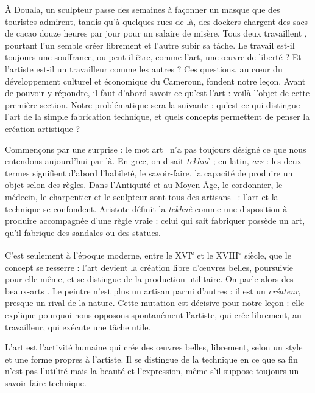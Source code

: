\documentclass[11pt]{article}
\newcommand{\cle}[1]{{\popxbold\color{popdark}#1}}
\newcounter{popsec}
\newcounter{popsub}
\newcommand{\courssub}[1]{%
  \stepcounter{popsub}%
  \par\vspace{9pt}\noindent{\popxbold\fontsize{11.5}{13}\selectfont\color{popink}{\color{poporange}\thepopsec.\thepopsub}\hspace{6pt}#1}\par\nopagebreak\vspace{4pt}
}
\begin{document}
À Douala, un sculpteur passe des semaines à façonner un masque que des touristes admirent, tandis qu'à quelques rues de là, des dockers chargent des sacs de cacao douze heures par jour pour un salaire de misère. Tous deux \guillemotleft travaillent \guillemotright, pourtant l'un semble créer librement et l'autre subir sa tâche. Le travail est-il toujours une souffrance, ou peut-il être, comme l'art, une œuvre de liberté ? Et l'artiste est-il un travailleur comme les autres ? Ces questions, au cœur du développement culturel et économique du Cameroun, fondent notre leçon. Avant de pouvoir y répondre, il faut d'abord savoir ce qu'est l'art : voilà l'objet de cette première section. Notre problématique sera la suivante : qu'est-ce qui distingue l'art de la simple fabrication technique, et quels concepts permettent de penser la création artistique ?

\courssub{Étymologie et histoire du concept d'art}

Commençons par une surprise : le mot \guillemotleft art \guillemotright\ n'a pas toujours désigné ce que nous entendons aujourd'hui par là. En grec, on disait \emph{tekhnè} ; en latin, \emph{ars} : les deux termes signifient d'abord l'\cle{habileté}, le \cle{savoir-faire}, la capacité de produire un objet selon des règles. Dans l'Antiquité et au Moyen Âge, le cordonnier, le médecin, le charpentier et le sculpteur sont tous des \guillemotleft artisans \guillemotright\ : l'art et la technique se confondent. Aristote définit la \emph{tekhnè} comme une disposition à produire accompagnée d'une règle vraie : celui qui sait fabriquer possède un art, qu'il fabrique des sandales ou des statues.

C'est seulement à l'époque moderne, entre le XVI\textsuperscript{e} et le XVIII\textsuperscript{e} siècle, que le concept se resserre : l'\cle{art} devient la création libre d'œuvres belles, poursuivie pour elle-même, et se distingue de la production utilitaire. On parle alors des \guillemotleft beaux-arts \guillemotright. Le peintre n'est plus un artisan parmi d'autres : il est un \emph{créateur}, presque un rival de la nature. Cette mutation est décisive pour notre leçon : elle explique pourquoi nous opposons spontanément l'artiste, qui crée librement, au travailleur, qui exécute une tâche utile.

\begin{definition}[L'art]
L'\cle{art} est l'activité humaine qui crée des œuvres belles, librement, selon un \cle{style} et une \cle{forme} propres à l'artiste. Il se distingue de la technique en ce que sa fin n'est pas l'utilité mais la beauté et l'expression, même s'il suppose toujours un savoir-faire technique.
\end{definition}
\end{document}

